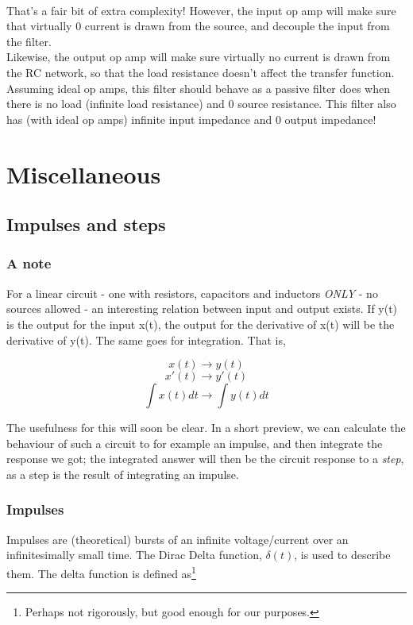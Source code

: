 \documentclass[12pt,a4paper]{report}
\begin{document}
\ \\
That's a fair bit of extra complexity! However, the input op amp will make sure that virtually 0 current is drawn from the source, and decouple the input from the filter.\\
Likewise, the output op amp will make sure virtually no current is drawn from the RC network, so that the load resistance doesn't affect the transfer function.\\
Assuming ideal op amps, this filter should behave as a passive filter does when there is no load (infinite load resistance) and 0 source resistance. This filter also has (with ideal op amps) infinite input impedance and 0 output impedance!


\chapter{Miscellaneous}
\section{Impulses and steps}

\subsection{A note}
For a linear circuit - one with resistors, capacitors and inductors \emph{ONLY} - no sources allowed - an interesting relation between input and output exists. If y(t) is the output for the input x(t), the output for the derivative of x(t) will be the derivative of y(t). The same goes for integration. That is,

\[ x(t) \to y(t) \]
\[ x'(t) \to y'(t) \]
\[ \int x(t) dt \to \int y(t) dt \]

The usefulness for this will soon be clear. In a short preview, we can calculate the behaviour of such a circuit to for example an impulse, and then integrate the response we got; the integrated answer will then be the circuit response to a \emph{step}, as a step is the result of integrating an impulse.

\subsection{Impulses}
Impulses are (theoretical) bursts of an infinite voltage/current over an infinitesimally small time. The Dirac Delta function, $\delta(t)$, is used to describe them. The delta function is defined as\footnote{Perhaps not rigorously, but good enough for our purposes.}
\end{document}
